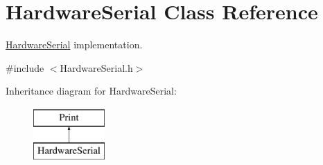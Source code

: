 \hypertarget{class_hardware_serial}{
\section{HardwareSerial Class Reference}
\label{class_hardware_serial}
}


\hyperlink{class_hardware_serial}{HardwareSerial} implementation.  




{\ttfamily \#include $<$HardwareSerial.h$>$}

Inheritance diagram for HardwareSerial:\begin{figure}[H]
\begin{center}
\leavevmode
\includegraphics[height=2.000000cm]{class_hardware_serial}
\end{center}
\end{figure}
